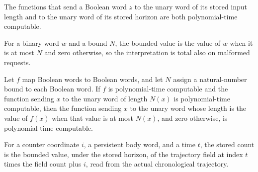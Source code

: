 \begin{lemma}
\label{Complexity.clA5Sizes_native}
\leanok
{}
The functions that send a Boolean word $z$ to the unary word of its stored input length
and to the unary word of its stored horizon are both polynomial-time computable.
\end{lemma}

\begin{definition}
\label{Complexity.clA5SmallNum}
\leanok
{}
For a binary word $w$ and a bound $N$, the bounded value is the value of $w$ when it is at most $N$ and zero otherwise, so the interpretation is total also on malformed requests.
\end{definition}

\begin{lemma}
\label{Complexity.clA5SmallNum_native}
\leanok
{}
Let $f$ map Boolean words to Boolean words, and let $N$ assign a natural-number bound to
each Boolean word. If $f$ is polynomial-time computable and the function sending $x$ to
the unary word of length $N(x)$ is polynomial-time computable, then the function sending
$x$ to the unary word whose length is the value of $f(x)$ when that value is at most
$N(x)$, and zero otherwise, is polynomial-time computable.
\end{lemma}

\begin{definition}
\label{Complexity.clA5Count}
\leanok
{}
For a counter coordinate $i$, a persistent body word, and a time $t$, the stored count is the bounded value, under the stored horizon, of the trajectory field at index $t$ times the field count plus $i$, read from the actual chronological trajectory.
\end{definition}

